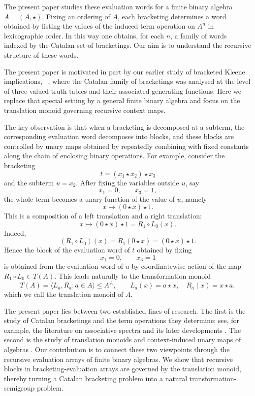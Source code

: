 \documentclass[11pt]{article}
\begin{document}
The present paper studies these evaluation words for a finite binary algebra
\(A=(A,\star)\). Fixing an ordering of \(A\), each bracketing determines a word
obtained by listing the values of the induced term operation on \(A^n\) in
lexicographic order. In this way one obtains, for each \(n\), a family of words
indexed by the Catalan set of bracketings. Our aim is to understand the
recursive structure of these words.

The present paper is motivated in part by our earlier study of bracketed
Kleene implications, ~\cite{Yildiz2021}, where the Catalan family of bracketings was analysed at
the level of three-valued truth tables and their associated generating
functions. Here we replace that special setting by a general finite binary
algebra and focus on the translation monoid governing recursive context maps.

The key observation is that when a bracketing is decomposed at a subterm, the
corresponding evaluation word decomposes into blocks, and these blocks are
controlled by unary maps obtained by repeatedly combining with fixed constants
along the chain of enclosing binary operations. For example, consider the bracketing
\[
t=(x_1\star x_2)\star x_3
\]
and the subterm \(u=x_2\). After fixing the variables outside \(u\), say
\[
x_1=0,\qquad x_3=1,
\]
the whole term becomes a unary function of the value of \(u\), namely
\[
x\longmapsto (0\star x)\star 1.
\]
This is a composition of a left translation and a right translation:
\[
x\longmapsto (0\star x)\star 1 = R_1\circ L_0(x).
\]
Indeed,
\[
(R_1\circ L_0)(x)=R_1(0\star x)=(0\star x)\star 1.
\]
Hence the block of the evaluation word of \(t\) obtained by fixing
\[
x_1=0,\qquad x_3=1
\]
is obtained from the evaluation word of \(u\) by coordinatewise action of the
map \(R_1\circ L_0\in T(A)\). This leads naturally to the transformation monoid
\[
T(A)=\langle L_a,R_a : a\in A\rangle \leq A^A,
\qquad
L_a(x)=a\star x,\quad R_a(x)=x\star a,
\]
which we call the translation monoid of \(A\).


The present paper lies between two established lines of research. The first is
the study of Catalan bracketings and the term operations they determine; see,
for example, the literature on associative spectra and its later developments
\cite{CsakanyWaldhauser2000,HuangLehtonen2023}. The second is the study of
translation monoids and context-induced unary maps of algebras
\cite{Petkovic2006,Piirainen2013}. Our contribution is to connect these two
 viewpoints through the recursive evaluation arrays of finite binary algebras.
We show that recursive blocks in bracketing-evaluation arrays are governed 
by the translation monoid, thereby turning a Catalan bracketing problem into 
a natural transformation-semigroup problem.
\end{document}
